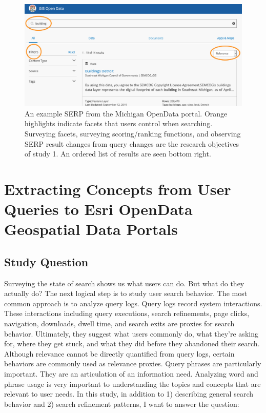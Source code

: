 \begin{figure}[H]
    \centering
    \includegraphics[width=1\textwidth]{../figures/Methods_OpenData.png}
    \caption{An example SERP from the Michigan OpenData portal. Orange highlights indicate facets that users control when searching. Surveying facets, surveying scoring/ranking functions, and observing SERP result changes from query changes are the research objectives of study 1. An ordered list of results are seen bottom right.}
    \label{fig:Methods_OpenData}
\end{figure}

\section{Extracting Concepts from User Queries to Esri OpenData Geospatial Data Portals}

\subsection{Study Question}
Surveying the state of search shows us what users can do. But what do they actually do? The next logical step is to study user search behavior. The most common approach is to analyze query logs. Query logs record system interactions. These interactions including query executions, search refinements, page clicks, navigation, downloads, dwell time, and search exits are proxies for search behavior. Ultimately, they suggest what users commonly do, what they’re asking for, where they get stuck, and what they did before they abandoned their search. Although relevance cannot be directly quantified from query logs, certain behaviors are commonly used as relevance proxies. Query phrases are particularly important. They are an articulation of an information need. Analyzing word and phrase usage is very important to understanding the topics and concepts that are relevant to user needs. In this study, in addition to 1) describing general search behavior and 2) search refinement patterns, I want to answer the question:
\linebreak

